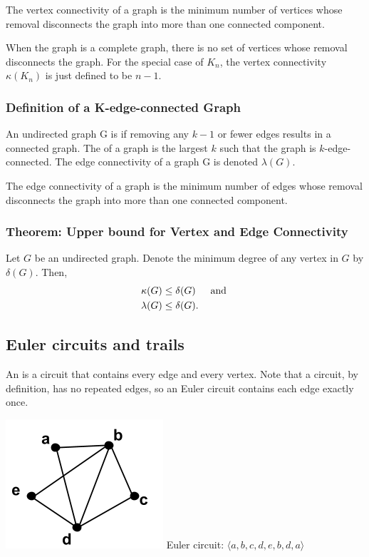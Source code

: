 The vertex connectivity of a graph is the minimum number of vertices whose removal disconnects the graph into more than one connected component.

When the graph is a complete graph, there is no set of vertices whose removal disconnects the graph. For the special case of $K_n$, the vertex connectivity $\kappa(K_n)$ is just defined to be $n - 1$.

\subsubsection*{Definition of a K-edge-connected Graph}
An undirected graph G is  if removing any $k - 1$ or fewer edges results in a connected graph. The  of a graph is the largest $k$ such that the graph is $k$-edge-connected. The edge connectivity of a graph G is denoted $\lambda(G)$.

The edge connectivity of a graph is the minimum number of edges whose removal disconnects the graph into more than one connected component.

\subsubsection*{Theorem: Upper bound for Vertex and Edge Connectivity}
Let $G$ be an undirected graph. Denote the minimum degree of any vertex in $G$ by $\delta(G)$. Then,
\begin{align*}
  \kappa(G)  & \leq \delta(G)~~~\operatorname{~\text{and}~} \\
  \lambda(G) & \leq \delta(G).
\end{align*}

\subsection{Euler circuits and trails}
An  is a circuit that contains every edge and every vertex. Note that a circuit, by definition, has no repeated edges, so an Euler circuit contains each edge exactly once.
\begin{center}
  \includegraphics[width=0.2\linewidth]{resources/euler circuit example.png}
  Euler circuit: $\langle a,b,c,d,e,b,d,a \rangle$
\end{center}

